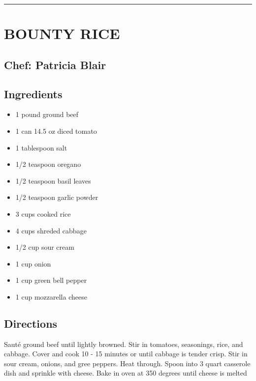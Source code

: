 \documentclass[
]{book}
\providecommand{\tightlist}{%
  \setlength{\itemsep}{0pt}\setlength{\parskip}{0pt}}
\begin{document}
\begin{center}\rule{0.5\linewidth}{0.5pt}\end{center}

\hypertarget{bounty-rice}{%
\section*{BOUNTY RICE}\label{bounty-rice}}


\hypertarget{chef-patricia-blair-10}{%
\subsection*{Chef: Patricia Blair}\label{chef-patricia-blair-10}}


\hypertarget{ingredients-45}{%
\subsection*{Ingredients}\label{ingredients-45}}


\begin{itemize}
\tightlist
\item
  1 pound ground beef
\item
  1 can 14.5 oz diced tomato
\item
  1 tablespoon salt
\item
  1/2 teaspoon oregano
\item
  1/2 teaspoon basil leaves
\item
  1/2 teaspoon garlic powder
\item
  3 cups cooked rice
\item
  4 cups shreded cabbage
\item
  1/2 cup sour cream
\item
  1 cup onion
\item
  1 cup green bell pepper
\item
  1 cup mozzarella cheese
\end{itemize}

\hypertarget{directions-45}{%
\subsection*{Directions}\label{directions-45}}


Sauté ground beef until lightly browned. Stir in tomatoes, seasonings, rice, and cabbage.
Cover and cook 10 - 15 minutes or until cabbage is tender crisp. Stir in sour cream, onions,
and gree peppers. Heat through. Spoon into 3 quart casserole dish and sprinkle with cheese.
Bake in oven at 350 degrees until cheese is melted
\end{document}
